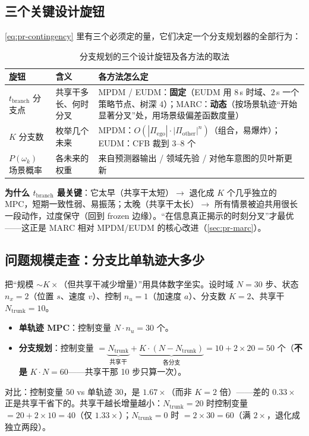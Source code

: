\subsection{三个关键设计旋钮}
\label{sec:pr-branch-knobs}

\cref{eq:pr-contingency} 里有三个必须定的量，它们决定一个分支规划器的全部行为：

\begin{table}[H]\centering\small
\caption{分支规划的三个设计旋钮及各方法的取法}
\label{tab:pr-knobs}
\begin{tabular}{p{} p{} p{}}
\toprule
旋钮 & 含义 & 各方法怎么定 \\
\midrule
$t_{\mathrm{branch}}$ 分支点 & 共享干多长、何时分叉 & MPDM / EUDM：\textbf{固定}（EUDM 用 $8\,$s 时域、$2\,$s 一个策略节点、树深 4）；MARC：\textbf{动态}（按场景轨迹“开始显著分叉”处，用场景级偏差函数度量） \\
$K$ 分支数 & 枚举几个未来 & MPDM：$O(|\Pi_{\mathrm{ego}}|\cdot|\Pi_{\mathrm{other}}|^{n})$（组合，易爆炸）；EUDM：CFB 裁到 $3$--$8$ 个 \\
$P(\omega_k)$ 场景概率 & 各未来的权重 & 来自预测器输出 / 领域先验 / 对他车意图的贝叶斯更新 \\
\bottomrule
\end{tabular}
\end{table}

\textbf{为什么 $t_{\mathrm{branch}}$ 最关键}：它太早（共享干太短）$\to$ 退化成 $K$ 个几乎独立的 MPC，短期一致性弱、易振荡；太晚（共享干太长）$\to$ 所有情景被迫共用很长一段动作，过度保守（回到 frozen 边缘）。“在信息真正揭示的时刻分叉”才最优——这正是 MARC 相对 MPDM/EUDM 的核心改进（\cref{sec:pr-marc}）。

\subsection{问题规模走查：分支比单轨迹大多少}
\label{sec:pr-branch-size}

把“规模 $\sim K\times$（但共享干减少增量）”用具体数字坐实。设时域 $N=30$ 步、状态 $n_x=2$（位置 $s$、速度 $v$）、控制 $n_u=1$（加速度 $a$）、分支数 $K=2$、共享干 $N_{\mathrm{trunk}}=10$。
\begin{itemize}
  \item \textbf{单轨迹 MPC}：控制变量 $N\cdot n_u=30$ 个。
  \item \textbf{分支规划}：控制变量 $=\underbrace{N_{\mathrm{trunk}}}_{\text{共享干}}+\underbrace{K\cdot(N-N_{\mathrm{trunk}})}_{\text{各分支}}=10+2\times20=50$ 个（\textbf{不是} $K\cdot N=60$——共享干那 10 步只算一次）。
\end{itemize}
对比：控制变量 $50$ vs 单轨迹 $30$，是 $1.67\times$（而非 $K=2$ 倍）——差的 $0.33\times$ 正是共享干省下的。共享干越长增量越小：$N_{\mathrm{trunk}}=20$ 时控制变量 $=20+2\times10=40$（仅 $1.33\times$）；$N_{\mathrm{trunk}}=0$ 时 $=2\times30=60$（满 $2\times$，退化成独立两段）。

